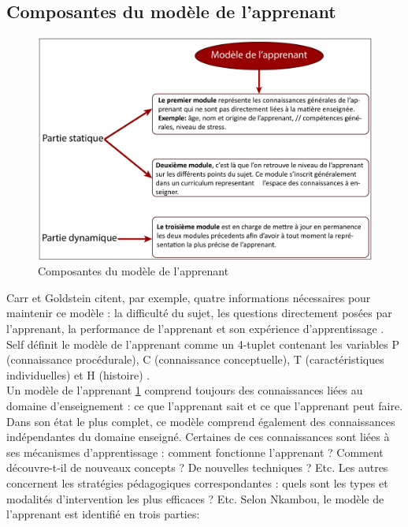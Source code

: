 \subsection{Composantes du modèle de l'apprenant}
\begin{figure}[H]
	\begin{center}
		\includegraphics[width=\textwidth]{images/chapitre2/Composante_modele_apprenant.png}
	\end{center}
\caption{Composantes du modèle de l'apprenant}
\label{learnerModel}
\end{figure}
Carr et Goldstein citent, par exemple, quatre informations nécessaires pour maintenir ce modèle : la difficulté du sujet, les questions directement posées par l’apprenant, la performance de l’apprenant et son expérience d’apprentissage \cite{knowledge_based_scheduling_program}. Self définit le modèle de l'apprenant comme un 4-tuplet contenant les variables P (connaissance procédurale), C (connaissance conceptuelle), T (caractéristiques individuelles) et H (histoire) \cite{Elster1987self}. \\
Un modèle de l'apprenant \ref{learnerModel} comprend toujours des connaissances liées au domaine d'enseignement : ce que l'apprenant sait et ce que l'apprenant peut faire. Dans son état le plus complet, ce modèle comprend également des connaissances indépendantes du domaine enseigné. Certaines de ces connaissances sont liées à ses mécanismes d'apprentissage : comment fonctionne l'apprenant ? Comment découvre-t-il de nouveaux concepts ? De nouvelles techniques ? Etc. Les autres concernent les stratégies pédagogiques correspondantes : quels sont les types et modalités d'intervention les plus efficaces ? Etc.
Selon Nkambou, le modèle de l'apprenant est identifié en trois parties: \cite{modeles_outils_applications}

